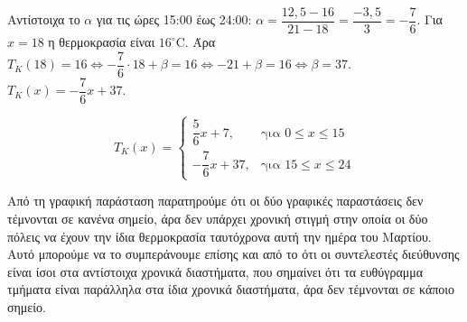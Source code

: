 \begin{alist}
\begin{rlist}
Αντίστοιχα το $\alpha$ για τις ώρες 15:00 έως 24:00: $\alpha = \dfrac{12,5 - 16}{21 - 18} = \dfrac{-3,5}{3} = -\dfrac{7}{6}$.
Για $x = 18$ η θερμοκρασία είναι $16^\circ\text{C}$.
Άρα $T_K(18) = 16 \Leftrightarrow -\dfrac{7}{6} \cdot 18 + \beta = 16 \Leftrightarrow -21 + \beta = 16 \Leftrightarrow \beta = 37$.
$T_K(x) = -\dfrac{7}{6}x + 37$.

\[T_K(x) = \begin{cases} \dfrac{5}{6}x + 7, & \text{για } 0 \le x \le 15 \\[2ex] -\dfrac{7}{6}x + 37, & \text{για } 15 \le x \le 24 \end{cases}\]
\end{rlist}

\item Από τη γραφική παράσταση παρατηρούμε ότι οι δύο γραφικές παραστάσεις δεν τέμνονται σε κανένα σημείο, άρα δεν υπάρχει χρονική στιγμή στην οποία οι δύο πόλεις να έχουν την ίδια θερμοκρασία ταυτόχρονα αυτή την ημέρα του Μαρτίου. Αυτό μπορούμε να το συμπεράνουμε επίσης και από το ότι οι συντελεστές διεύθυνσης είναι ίσοι στα αντίστοιχα χρονικά διαστήματα, που σημαίνει ότι τα ευθύγραμμα τμήματα είναι παράλληλα στα ίδια χρονικά διαστήματα, άρα δεν τέμνονται σε κάποιο σημείο.
\end{alist}

